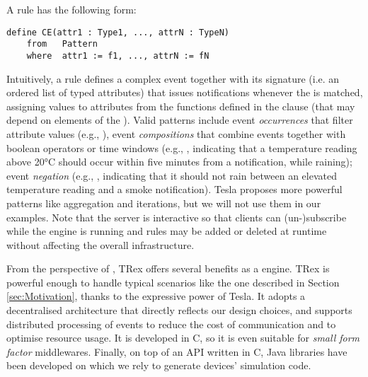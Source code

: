 A rule has the following form:
\begin{lstlisting}[language=tesla, numbers=none]
	define CE(attr1 : Type1, ..., attrN : TypeN)
	from   Pattern
	where  attr1 := f1, ..., attrN := fN
\end{lstlisting}
Intuitively, a rule defines a complex event  together with its signature (i.e. an ordered list of typed attributes) that issues  notifications whenever the  is matched, assigning values to  attributes from the functions defined in the  clause (that may depend on elements of the ). Valid patterns include event \emph{occurrences} that filter attribute values (e.g., ), event \emph{compositions} that combine events together with boolean operators or time windows (e.g., , indicating that a temperature reading above 20°C should occur within five minutes from a  notification, while raining); event \emph{negation} (e.g., , indicating that it should not rain between an elevated temperature reading and a smoke notification). Tesla proposes more powerful patterns like aggregation and iterations, but we will not use them in our examples.
Note that the server is interactive so that clients can (un-)subscribe while the engine is running and rules may be added or deleted at runtime without affecting the overall infrastructure. 

From the perspective of \IOTDSL, TRex offers several benefits as a \CEP engine. TRex is powerful enough to handle typical \IOT scenarios like the one described in Section \ref{sec:Motivation}, thanks to the expressive power of Tesla. It adopts a decentralised architecture that directly reflects our design choices, and supports distributed processing of events to reduce the cost of communication and to optimise resource usage. It is developed in C, so it is even suitable for \textit{small form factor} middlewares. Finally, on top of an \textsc{API} written in C, Java libraries have been developed on which we rely to generate devices' simulation code.
